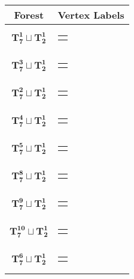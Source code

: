 \documentclass{article}
\begin{document}
\renewcommand{\arraystretch}{1.2} %
\setlength{\tabcolsep}{8pt} %
{\def\arraystretch{1.2}%
    \begin{longtable}{|c|c|} %
        \hline
        Forest & Vertex Labels \\
        \hline
            $\mathbf{T_{7}^{1}} \sqcup \mathbf{T_{2}^{1}}$ & \begin{tabular}{@{}l@{}} $(0,6,1,5,2,9,7)\sqcup(3,4)$ \end{tabular} \\ \hline
    $\mathbf{T_{7}^{3}} \sqcup \mathbf{T_{2}^{1}}$ & \begin{tabular}{@{}l@{}} $(9,2,5,1,6,0,3)\sqcup(8,7)$ \end{tabular} \\ \hline
    $\mathbf{T_{7}^{2}} \sqcup \mathbf{T_{2}^{1}}$ & \begin{tabular}{@{}l@{}} $(9,2,5,1,6,0,4)\sqcup(8,7)$ \end{tabular} \\ \hline
    $\mathbf{T_{7}^{4}} \sqcup \mathbf{T_{2}^{1}}$ & \begin{tabular}{@{}l@{}} $(5,1,4,2,9,6,7)\sqcup(10,11)$ \end{tabular} \\ \hline
    $\mathbf{T_{7}^{5}} \sqcup \mathbf{T_{2}^{1}}$ & \begin{tabular}{@{}l@{}} $(3,8,1,4,2,5,7)\sqcup(9,10)$ \end{tabular} \\ \hline
    $\mathbf{T_{7}^{8}} \sqcup \mathbf{T_{2}^{1}}$ & \begin{tabular}{@{}l@{}} $(7,8,1,6,0,4,3)\sqcup(9,11)$ \end{tabular} \\ \hline
    $\mathbf{T_{7}^{9}} \sqcup \mathbf{T_{2}^{1}}$ & \begin{tabular}{@{}l@{}} $(8,1,6,3,4,5,7)\sqcup(9,10)$ \end{tabular} \\ \hline
    $\mathbf{T_{7}^{10}} \sqcup \mathbf{T_{2}^{1}}$ & \begin{tabular}{@{}l@{}} $(6,1,5,3,8,4,7)\sqcup(9,10)$ \end{tabular} \\ \hline
    $\mathbf{T_{7}^{6}} \sqcup \mathbf{T_{2}^{1}}$ & \begin{tabular}{@{}l@{}} $(5,11,9,10,6,12,7)\sqcup(8,1)$ \end{tabular} \\ \hline

\end{longtable}}
\end{document}
